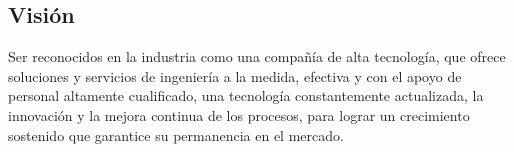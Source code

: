 \subsection{Visión}
Ser reconocidos en la industria como una compañía de alta tecnología, que ofrece soluciones y servicios de ingeniería a la medida, efectiva y con el apoyo de personal altamente cualificado, una tecnología constantemente actualizada, la innovación y la mejora continua de los procesos, para lograr un crecimiento sostenido que garantice su permanencia en el mercado.
%
